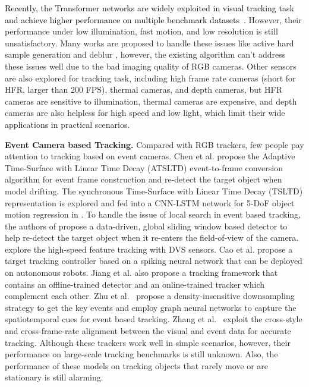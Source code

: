 \documentclass[journal]{IEEEtran}
\begin{document}
\textcolor{black}{
Recently, the Transformer networks are widely exploited in visual tracking task and achieve higher performance on multiple benchmark datasets~\cite{chen2021TransT}.   
}
However, their performance under low illumination, fast motion, and low resolution is still unsatisfactory. Many works are proposed to handle these issues like active hard sample generation \cite{Wang_2018_CVPR, song2018vital} and deblur \cite{guo2019effects}, however, the existing algorithm can't address these issues well due to the bad imaging quality of RGB cameras. Other sensors are also explored for tracking task, including high frame rate cameras (short for HFR, larger than 200 FPS), thermal cameras, and depth cameras, but HFR cameras are sensitive to illumination, thermal cameras are expensive, and depth cameras are also helpless for high speed and low light, which limit their wide applications in practical scenarios. 


\noindent 
\textbf{Event Camera based Tracking. }
Compared with RGB trackers, few people pay attention to tracking based on event cameras. Chen et al. \cite{chen2019asynchronouseventtrack, chen2020eventTrack} propose the Adaptive Time-Surface with Linear Time Decay (ATSLTD) event-to-frame conversion algorithm for event frame construction and re-detect the target object when model drifting. The synchronous Time-Surface with Linear Time Decay (TSLTD) representation is explored and fed into a CNN-LSTM network for 5-DoF object motion regression in \cite{chen2020eventTrack}. To handle the issue of local search in event based tracking, the authors of \cite{ramesh2018eventlong} propose a data-driven, global sliding window based detector to help re-detect the target object when it re-enters the field-of-view of the camera. \cite{chamorro2020highevent, alzugaray2020haste} explore the high-speed feature tracking with DVS sensors. Cao et al. \cite{cao2015SNNtrack} propose a target tracking controller based on a spiking neural network that can be deployed on autonomous robots. Jiang et al. \cite{jiang2020object} also propose a tracking framework that contains an offline-trained detector and an online-trained tracker which complement each other. 
Zhu et al.~\cite{zhu2022GrapheventTrack} propose a density-insensitive downsampling strategy to get the key events and employ graph neural networks to capture the spatiotemporal cues for event based tracking.
Zhang et al.~\cite{zhang2023fealignTrack} exploit the cross-style and cross-frame-rate alignment between the visual and event data for accurate tracking. 
Although these trackers work well in simple scenarios, however, their performance on large-scale tracking benchmarks is still unknown. Also, the performance of these models on tracking objects that rarely move or are stationary is still alarming. 
\end{document}
